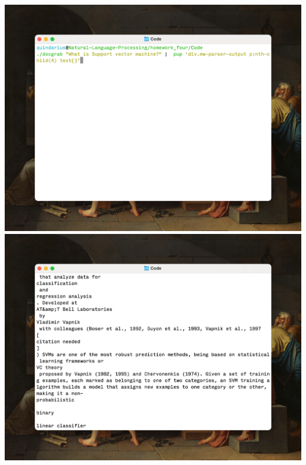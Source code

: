 \includegraphics[width= \textwidth]{images/setup}
\includegraphics[width= \textwidth]{images/document}
